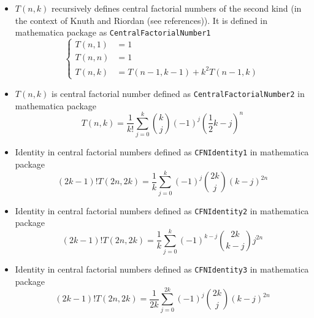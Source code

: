 \begin{itemize}
    \item $T(n,k)$ recursively defines central factorial numbers of the second kind
    (in the context of Knuth and Riordan (see references)).
    It is defined in mathematica package as \texttt{CentralFactorialNumber1}
    \begin{equation*}
        \begin{cases}
            T(n,1) &= 1 \\
            T(n,n) &= 1 \\
            T(n,k) &= T(n-1, k-1) + k^2 T(n-1, k)
        \end{cases}
    \end{equation*}
    \item $T(n,k)$ is central factorial number defined as \texttt{CentralFactorialNumber2} in mathematica package
    \begin{equation*}
        T(n,k) = \frac{1}{k!} \sum_{j=0}^{k} \binom{k}{j} (-1)^{j} \left( \frac{1}{2}k - j \right)^{n}
    \end{equation*}
    \item Identity in central factorial numbers defined as \texttt{CFNIdentity1} in mathematica package
    \begin{equation*}
    (2k-1)! T(2n,2k) = \frac{1}{k} \sum_{j=0}^{k} (-1)^j \binom{2k}{j} (k-j)^{2n}
    \end{equation*}
    \item Identity in central factorial numbers defined as \texttt{CFNIdentity2} in mathematica package
    \begin{equation*}
    (2k-1)! T(2n,2k) = \frac{1}{k} \sum_{j=0}^{k} (-1)^{k-j} \binom{2k}{k-j} j^{2n}
    \end{equation*}
    \item Identity in central factorial numbers defined as \texttt{CFNIdentity3} in mathematica package
    \begin{equation*}
    (2k-1)! T(2n, 2k) = \frac{1}{2k} \sum_{j=0}^{2k} (-1)^{j} \binom{2k}{j} (k-j)^{2n}
    \end{equation*}
\end{itemize}
